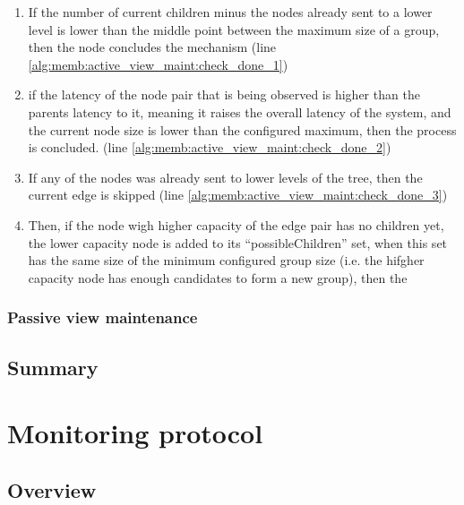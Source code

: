 \begin{enumerate}
    \item If the number of current children minus the nodes already sent to a lower level is lower than the middle point between the maximum size of a group, then the node concludes the mechanism (line \ref{alg:memb:active_view_maint:check_done_1})
    
    \item if the latency of the node pair that is being observed is higher than the parents latency to it, meaning it raises the overall latency of the system, and the current node size is lower than the configured maximum, then the process is concluded. (line \ref{alg:memb:active_view_maint:check_done_2})
    
    \item If any of the nodes was already sent to lower levels of the tree, then the current edge is skipped (line \ref{alg:memb:active_view_maint:check_done_3})
    
    \item Then, if the node wigh higher capacity of the edge pair has no children yet, the lower capacity node is added to its ``possibleChildren'' set, when this set has the same size of the minimum configured group size (i.e. the hifgher capacity node has enough candidates to form a new group), then the 
\end{enumerate}





\subsubsection{Passive view maintenance}


\subsection{Summary}

\section{Monitoring protocol}

\subsection{Overview}

